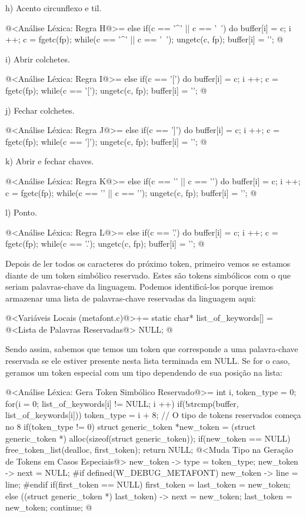 h) Acento circunflexo e til.

\iniciocodigo
@<Análise Léxica: Regra H@>=
else if(c == '^' || c == '~'){
  do{
    buffer[i] = c;
    i ++;
    c = fgetc(fp);
  } while(c == '^' || c == '~');
  ungetc(c, fp);
  buffer[i] = '\0';
}
@
\fimcodigo

i) Abrir colchetes.

\iniciocodigo
@<Análise Léxica: Regra I@>=
else if(c == '['){
  do{
    buffer[i] = c;
    i ++;
    c = fgetc(fp);
  } while(c == '[');
  ungetc(c, fp);
  buffer[i] = '\0';
}
@
\fimcodigo

j) Fechar colchetes.

\iniciocodigo
@<Análise Léxica: Regra J@>=
else if(c == ']'){
  do{
    buffer[i] = c;
    i ++;
    c = fgetc(fp);
  } while(c == ']');
  ungetc(c, fp);
  buffer[i] = '\0';
}
@
\fimcodigo

k) Abrir e fechar chaves.

\iniciocodigo
@<Análise Léxica: Regra K@>=
else if(c == '{' || c == '}'){
  do{
    buffer[i] = c;
    i ++;
    c = fgetc(fp);
  } while(c == '{' || c == '}');
  ungetc(c, fp);
  buffer[i] = '\0';
}
@
\fimcodigo

l) Ponto.

\iniciocodigo
@<Análise Léxica: Regra L@>=
else if(c == '.'){
  do{
    buffer[i] = c;
    i ++;
    c = fgetc(fp);
  } while(c == '.');
  ungetc(c, fp);
  buffer[i] = '\0';
}
@
\fimcodigo

Depois de ler todos os caracteres do próximo token, primeiro vemos se
estamos diante de um token simbólico reservado. Estes são tokens
simbólicos com o que seriam palavras-chave da linguagem. Podemos
identificá-los porque iremos armazenar uma lista de palavras-chave
reservadas da linguagem aqui:

\iniciocodigo
@<Variáveis Locais (metafont.c)@>+=
static char* list_of_keywords[] = {
@<Lista de Palavras Reservadas@>
  NULL};
@
\fimcodigo

Sendo assim, sabemos que temos um token que corresponde a uma
palavra-chave reservada se ele estiver presente nesta lista terminada
em NULL. Se for o caso, geramos um token especial com um tipo
dependendo de sua posição na lista:

\iniciocodigo
@<Análise Léxica: Gera Token Simbólico Reservado@>=
{
  int i, token_type = 0;
  for(i = 0; list_of_keywords[i] != NULL; i ++)
    if(!strcmp(buffer, list_of_keywords[i]))
      token_type = i + 8; // O tipo de tokens reservados começa no 8
  if(token_type != 0){
    struct generic_token *new_token =
       (struct generic_token *) alloc(sizeof(struct generic_token));
    if(new_token == NULL){
      free_token_list(dealloc, first_token);
      return NULL;
    }
    @<Muda Tipo na Geração de Tokens em Casos Especiais@>
    new_token -> type = token_type;
    new_token -> next = NULL;
#if defined(W_DEBUG_METAFONT)
    new_token -> line = line;
#endif
    if(first_token == NULL)
      first_token = last_token = new_token;
    else{
      ((struct generic_token *) last_token) -> next = new_token;
      last_token = new_token;
    }
    continue;
  }
}
@
\fimcodigo

